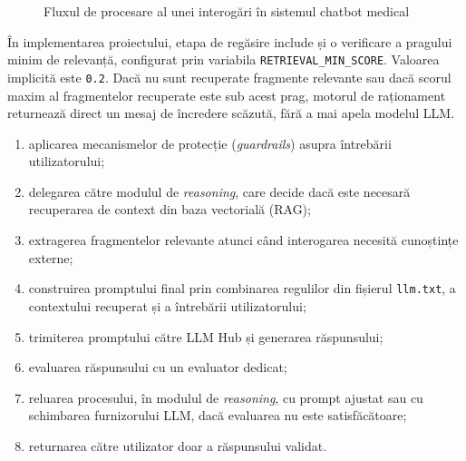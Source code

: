 \documentclass[12pt, a4paper, oneside, romanian]{teza-upb}
\begin{document}
\begin{figure}[H]
\centering
{}
\caption{Fluxul de procesare al unei interogări în sistemul chatbot medical}
\label{fig:pipeline}
\end{figure}

În implementarea proiectului, etapa de regăsire include și o verificare a pragului minim de relevanță, configurat prin variabila \texttt{RETRIEVAL\_MIN\_SCORE}. Valoarea implicită este \texttt{0.2}. Dacă nu sunt recuperate fragmente relevante sau dacă scorul maxim al fragmentelor recuperate este sub acest prag, motorul de raționament returnează direct un mesaj de încredere scăzută, fără a mai apela modelul LLM.

\begin{enumerate}
    \item aplicarea mecanismelor de protecție (\textit{guardrails}) asupra întrebării utilizatorului;
    \item delegarea către modulul de \textit{reasoning}, care decide dacă este necesară recuperarea de context din baza vectorială (RAG);
    \item extragerea fragmentelor relevante atunci când interogarea necesită cunoștințe externe;
    \item construirea promptului final prin combinarea regulilor din fișierul \texttt{llm.txt}, a contextului recuperat și a întrebării utilizatorului;
    \item trimiterea promptului către LLM Hub și generarea răspunsului;
    \item evaluarea răspunsului cu un evaluator dedicat;
    \item reluarea procesului, în modulul de \textit{reasoning}, cu prompt ajustat sau cu schimbarea furnizorului LLM, dacă evaluarea nu este satisfăcătoare;
    \item returnarea către utilizator doar a răspunsului validat.
\end{enumerate}
\end{document}
